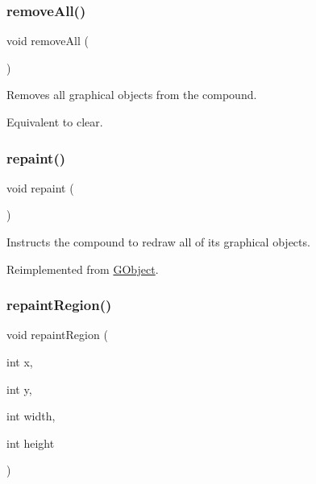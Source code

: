 \subsubsection{\texorpdfstring{remove\+All()}{removeAll()}}
{\footnotesize\ttfamily void remove\+All (\begin{DoxyParamCaption}{ }\end{DoxyParamCaption})\hspace{0.3cm}{\ttfamily [virtual]}}



Removes all graphical objects from the compound. 

Equivalent to clear. \mbox{\label{classGCompound_ac827b978aa122f136a14c198687ad80f}} 
\subsubsection{\texorpdfstring{repaint()}{repaint()}}
{\footnotesize\ttfamily void repaint (\begin{DoxyParamCaption}{ }\end{DoxyParamCaption})\hspace{0.3cm}{\ttfamily [virtual]}}



Instructs the compound to redraw all of its graphical objects. 



Reimplemented from \mbox{\hyperlink{classGObject_ac827b978aa122f136a14c198687ad80f}{G\+Object}}.

\mbox{\label{classGCompound_a4a919e3851ebfbf0f161a66cc15d4531}} 
\subsubsection{\texorpdfstring{repaint\+Region()}{repaintRegion()}\hspace{0.1cm}{\footnotesize\ttfamily [1/2]}}
{\footnotesize\ttfamily void repaint\+Region (\begin{DoxyParamCaption}\item[{int}]{x,  }\item[{int}]{y,  }\item[{int}]{width,  }\item[{int}]{height }\end{DoxyParamCaption})\hspace{0.3cm}{\ttfamily [virtual]}}



